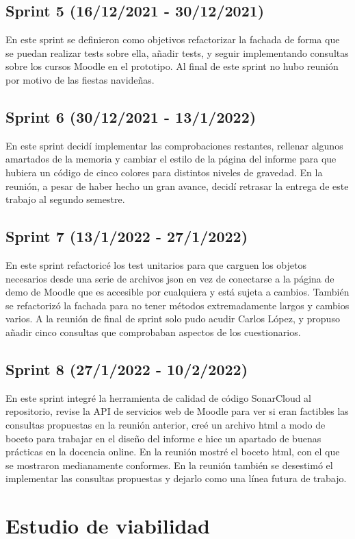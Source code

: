\subsection{Sprint 5 (16/12/2021 - 30/12/2021)}
	En este sprint se definieron como objetivos refactorizar la fachada de forma que se puedan realizar tests sobre ella, añadir tests, y seguir implementando consultas sobre los cursos Moodle en el prototipo. Al final de este sprint no hubo reunión por motivo de las fiestas navideñas.
\subsection{Sprint 6 (30/12/2021 - 13/1/2022)}
	En este sprint decidí implementar las comprobaciones restantes, rellenar algunos amartados de la memoria y cambiar el estilo de la página del informe para que hubiera un código de cinco colores para distintos niveles de gravedad. En la reunión, a pesar de haber hecho un gran avance, decidí retrasar la entrega de este trabajo al segundo semestre.
\subsection{Sprint 7 (13/1/2022 - 27/1/2022)}
	En este sprint refactoricé los test unitarios para que carguen los objetos necesarios desde una serie de archivos json en vez de conectarse a la página de demo de Moodle que es accesible por cualquiera y está sujeta a cambios. También se refactorizó la fachada para no tener métodos extremadamente largos y cambios varios. A la reunión de final de sprint solo pudo acudir Carlos López, y propuso añadir cinco consultas que comprobaban aspectos de los cuestionarios.
\subsection{Sprint 8 (27/1/2022 - 10/2/2022)}
	En este sprint integré la herramienta de calidad de código SonarCloud al repositorio, revise la API de servicios web de Moodle para ver si eran factibles las consultas propuestas en la reunión anterior, creé un archivo html a modo de boceto para trabajar en el diseño del informe e hice un apartado de buenas prácticas en la docencia online. En la reunión mostré el boceto html, con el que se mostraron medianamente conformes. En la reunión también se desestimó el implementar las consultas propuestas y dejarlo como una línea futura de trabajo.



\section{Estudio de viabilidad}

